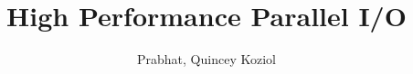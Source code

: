 \documentclass[sunil1,ChapterTOCs]{sunil}
\begin{document}
\bibliographyunit[\chapter]

\title{High Performance Parallel I/O}

\author{Prabhat, Quincey Koziol}


%
%
%



%

\mainmatter

%

\setcounter{page}{1}





\begin{bibunit}[plain]

\end{bibunit}

\begin{bibunit}[plain]

\end{bibunit}

\clearpage
\printindex
\end{document}
